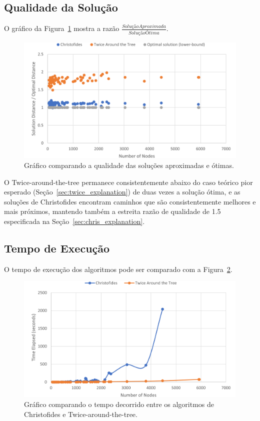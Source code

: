 \subsection{Qualidade da Solução} \label{sec:exp_quality}

O gráfico da Figura~\ref{fig:quality_ratio} mostra a razão $\frac{Solução Aproximada}{Solução Ótima}$.

\begin{figure}[ht]
\centering
\includegraphics[height=.325\textheight]{quality_ratio.png}
\caption{Gráfico comparando a qualidade das soluções aproximadas e ótimas.}
\label{fig:quality_ratio}
\end{figure}

O Twice-around-the-tree permanece consistentemente abaixo do caso teórico pior esperado (Seção~\ref{sec:twice_explanation}) de duas vezes a solução ótima, e as soluções de Christofides encontram caminhos que são consistentemente melhores e mais próximos, mantendo também a estreita razão de qualidade de 1.5 especificada na Seção~\ref{sec:chris_explanation}.

\subsection{Tempo de Execução} \label{sec:exp_time}

O tempo de execução dos algoritmos pode ser comparado com a Figura~\ref{fig:exec_time}.

\begin{figure}[ht]
\centering
\includegraphics[height=.325\textheight]{execution_time_comparison.png}
\caption{Gráfico comparando o tempo decorrido entre os algoritmos de Christofides e Twice-around-the-tree.}
\label{fig:exec_time}
\end{figure}

